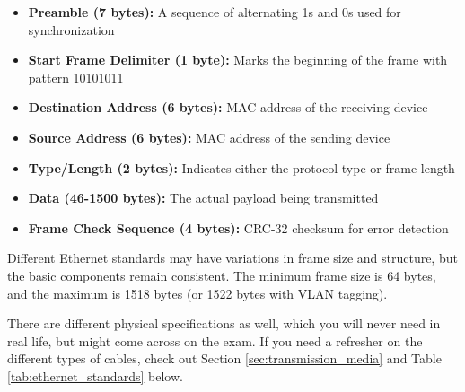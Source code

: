 \begin{itemize}
\item \textbf{Preamble (7 bytes):} A sequence of alternating 1s and 0s used for synchronization
\item \textbf{Start Frame Delimiter (1 byte):} Marks the beginning of the frame with pattern 10101011
\item \textbf{Destination Address (6 bytes):} MAC address of the receiving device
\item \textbf{Source Address (6 bytes):} MAC address of the sending device
\item \textbf{Type/Length (2 bytes):} Indicates either the protocol type or frame length
\item \textbf{Data (46-1500 bytes):} The actual payload being transmitted
\item \textbf{Frame Check Sequence (4 bytes):} CRC-32 checksum for error detection
\end{itemize}


Different Ethernet standards may have variations in frame size and structure, but the basic components remain consistent. The minimum frame size is 64 bytes, and the maximum is 1518 bytes (or 1522 bytes with VLAN tagging).

\newpage
There are different physical specifications as well, which you will never need in real life, but might come across on the exam. If you need a refresher on the different types of cables, check out Section \ref{sec:transmission_media} and Table \ref{tab:ethernet_standards} below.

